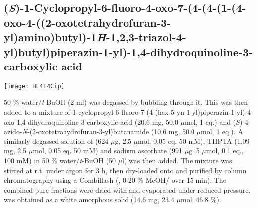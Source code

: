 {{{{{{{{{{{{\subsection{(\textit{S})-1-Cyclopropyl-6-fluoro-4-oxo-7-(4-(4-(1-(4-oxo-4-((2-oxotetrahydrofuran\hyp{}3\hyp{}yl)amino)butyl)-1\textit{H}-1,2,3-triazol-4-yl)butyl)piperazin-1-yl)-1,4-dihydroquin\allowbreak ol\allowbreak ine-3-carboxylic acid }
	
\begin{scheme}[H]
	\begin{center}
		\texttt{[image: HL4T4Cip]}
	\end{center}
\end{scheme}


50 \% water/\textit{t}-BuOH (2 ml) was degassed by bubbling  through it. This was then added to a mixture of 1-cyclopropyl-6-fluoro-7-(4-(hex-5-yn-1-yl)piperazin-1-yl)-4-oxo-1,4\hyp{}dihydro\-quinoline-3-carboxylic acid  (20.6 mg, 50.0 $\mu$mol, 1 eq.) and (\textit{S})-4-azido-\textit{N}-(2-oxotetrahydrofuran-3-yl)butanamide  (10.6 mg, 50.0 $\mu$mol, 1 eq.).
A similarly degassed solution of  (624 $\mu$g, 2.5 $\mu$mol, 0.05 eq. 50 mM), THPTA (1.09 mg, 2.5 $\mu$mol, 0.05 eq. 50 mM) and sodium ascorbate (991 $\mu$g, 5 $\mu$mol, 0.1 eq., 100 mM) in 50 \% water/\textit{t}-BuOH (50 $\mu$l) was then added. 
The mixture was stirred at r.t. under argon for 3 h, then dry-loaded onto  and purified by column chromatography using a Combiflash (, 0-20 \% MeOH/ over 15 min).
The combined pure fractions were dried with  and evaporated under reduced pressure.
 was obtained as a white amorphous solid (14.6 mg, 23.4 $\mu$mol, 46.8 \%).
\\[1\baselineskip]
\\[1\baselineskip]
}}}}}}}}}}}}

